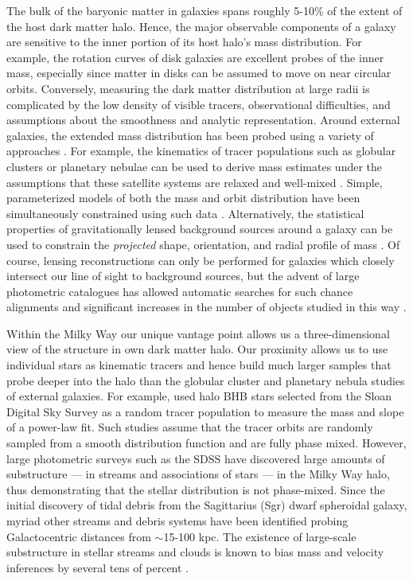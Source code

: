 \documentclass[letterpaper,12pt,preprint]{aastex}
\begin{document}
The bulk of the baryonic matter in galaxies spans roughly 5-10\% of the extent of the host dark matter halo. Hence, the major observable components of a galaxy are sensitive to the inner portion of its host halo's mass distribution. For example, the rotation curves of disk galaxies are excellent probes of the inner mass, especially since matter in disks can be assumed to move on near circular orbits. Conversely, measuring the dark matter distribution at large radii is complicated by the low density of visible tracers, observational difficulties, and assumptions about the smoothness and analytic representation. Around external galaxies, the extended mass distribution has been probed using a variety of approaches \citep[see][for a a complete and detailed review]{courteau13}. For example, the kinematics of tracer populations such as globular clusters or planetary nebulae can be used to derive mass estimates under the assumptions that these satellite systems are relaxed and well-mixed \citep[early investigations include][]{mendez01,cote03}. Simple, parameterized models of both the mass and orbit distribution have been simultaneously constrained using such data \citep[e.g.][]{napolitano11,deason12c}. 
Alternatively, the statistical properties of gravitationally lensed background sources around a galaxy can be used to constrain the \emph{projected} shape, orientation, and radial profile of mass \citep[as done by the Lens Structure and Dynamics Survey described in][]{koopmans02}. Of course, lensing reconstructions can only be performed for galaxies which closely intersect our line of sight to background sources, but the advent of large photometric catalogues has allowed automatic searches for such chance alignments and significant increases in the number of objects studied in this way \citep[e.g. the Sloan Lens ACS Survey, see][]{bolton06}.

Within the Milky Way our unique vantage point allows us a three-dimensional view of the structure in own dark matter halo. Our proximity allows us to use individual stars as kinematic tracers and hence build much larger samples that probe deeper into the halo than the globular cluster and planetary nebula studies of external galaxies. For example, \cite{deason12a} used halo BHB stars selected from the Sloan Digital Sky Survey \cite[SDSS;][]{york00} as a random tracer population to measure the mass and slope of a power-law fit. Such studies assume that the tracer orbits are randomly sampled from a smooth distribution function and are fully phase mixed. However, large photometric surveys such as the SDSS have discovered large amounts of substructure --- in streams and associations of stars --- in the Milky Way halo, thus demonstrating that the stellar distribution is not phase-mixed. Since the initial discovery of tidal debris from the Sagittarius (Sgr) dwarf spheroidal galaxy, myriad other streams and debris systems have been identified probing Galactocentric distances from $\sim$15-100 kpc. The existence of large-scale substructure in stellar streams and clouds is known to bias mass and velocity inferences by several tens of percent \citep{yencho06}.
\end{document}
